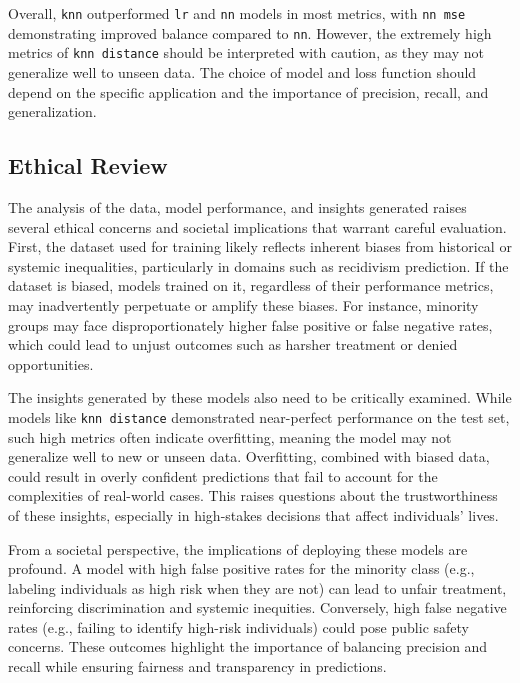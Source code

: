 	Overall, \texttt{knn} outperformed \texttt{lr} and \texttt{nn} models in most metrics, with \texttt{nn mse} demonstrating improved balance compared to \texttt{nn}. However, the extremely high metrics of \texttt{knn distance} should be interpreted with caution, as they may not generalize well to unseen data. The choice of model and loss function should depend on the specific application and the importance of precision, recall, and generalization.
	
	
	\subsection{Ethical Review}
		
	The analysis of the data, model performance, and insights generated raises several ethical concerns and societal implications that warrant careful evaluation. First, the dataset used for training likely reflects inherent biases from historical or systemic inequalities, particularly in domains such as recidivism prediction. If the dataset is biased, models trained on it, regardless of their performance metrics, may inadvertently perpetuate or amplify these biases. For instance, minority groups may face disproportionately higher false positive or false negative rates, which could lead to unjust outcomes such as harsher treatment or denied opportunities.
	
	The insights generated by these models also need to be critically examined. While models like \texttt{knn distance} demonstrated near-perfect performance on the test set, such high metrics often indicate overfitting, meaning the model may not generalize well to new or unseen data. Overfitting, combined with biased data, could result in overly confident predictions that fail to account for the complexities of real-world cases. This raises questions about the trustworthiness of these insights, especially in high-stakes decisions that affect individuals' lives.
	
	From a societal perspective, the implications of deploying these models are profound. A model with high false positive rates for the minority class (e.g., labeling individuals as high risk when they are not) can lead to unfair treatment, reinforcing discrimination and systemic inequities. Conversely, high false negative rates (e.g., failing to identify high-risk individuals) could pose public safety concerns. These outcomes highlight the importance of balancing precision and recall while ensuring fairness and transparency in predictions.
	
